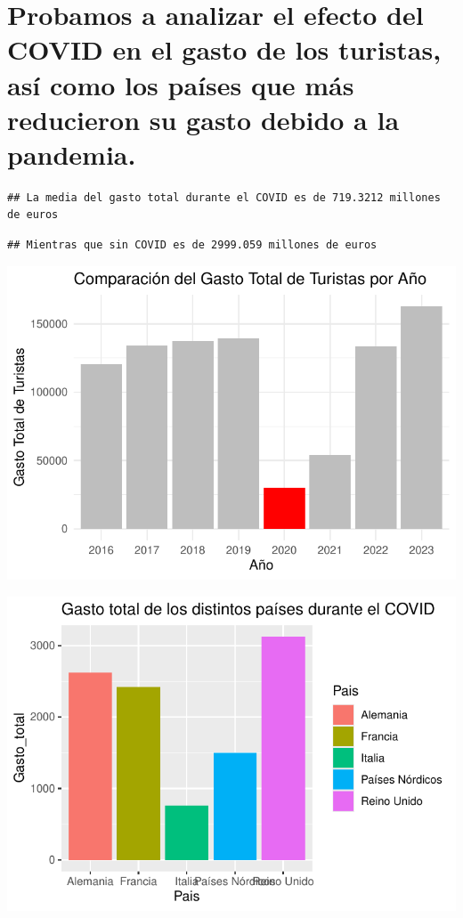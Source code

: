 \documentclass[data,article,submit,moreauthors,pdftex]{Definitions/mdpi}
\begin{document}
\section{Probamos a analizar el efecto del COVID en el gasto de los
turistas, así como los países que más reducieron su gasto debido a la
pandemia.}\label{probamos-a-analizar-el-efecto-del-covid-en-el-gasto-de-los-turistas-asuxed-como-los-pauxedses-que-muxe1s-reducieron-su-gasto-debido-a-la-pandemia.}

\begin{verbatim}
## La media del gasto total durante el COVID es de 719.3212 millones de euros
\end{verbatim}

\begin{verbatim}
## Mientras que sin COVID es de 2999.059 millones de euros
\end{verbatim}

\includegraphics{ProyectoAED2024_Rmd_files/figure-latex/unnamed-chunk-26-1}

\includegraphics{ProyectoAED2024_Rmd_files/figure-latex/unnamed-chunk-27-1}
\end{document}
